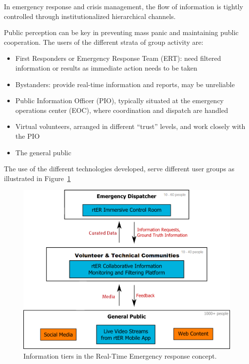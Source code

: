   
In emergency response and crisis management, the flow of information is tightly controlled through institutionalized hierarchical channels. 
\begin{munquote}
Public perception can be key in preventing mass panic and maintaining public cooperation. The users of the different strata of group activity are:
\begin{itemize}
\item First Responders or Emergency Response Team (ERT): need filtered information or results as immediate action needs to be taken
\item Bystanders: provide real-time information and reports, may be unreliable 
\item Public Information Officer (PIO), typically situated at the emergency operations center (EOC), where coordination and dispatch are handled   
\item Virtual volunteers, arranged in different “trust” levels, and work closely with the PIO
\item The general public
\end{itemize}
\end{munquote}
The use of the different technologies developed, serve different user groups as illustrated in Figure~\ref{fig:infotiers}
\begin{figure}
\begin{center}
\includegraphics[scale=0.2]{InformationTiers.png}
\caption{Information tiers in the Real-Time Emergency response concept.}
\label{fig:infotiers}
\end{center}
\end{figure}
